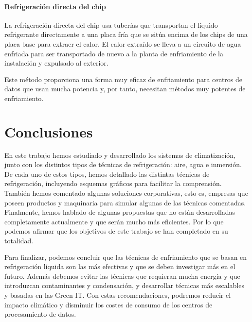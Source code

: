 \subsubsection{Refrigeración directa del chip}

La refrigeración directa del chip usa tuberías que transportan el líquido refrigerante directamente a una placa fría que se sitúa encima de los chips de una placa base para extraer el calor. El calor extraído se lleva a un circuito de agua enfriada para ser transportado de nuevo a la planta de enfriamiento de la instalación y expulsado al exterior.

Este método proporciona una forma muy eficaz de enfriamiento para centros de datos que usan mucha potencia y, por tanto, necesitan métodos muy potentes de enfriamiento.

\chapter{Conclusiones}

En este trabajo hemos estudiado y desarrollado los sistemas de climatización, junto con los distintos tipos de técnicas de refrigeración: aire, agua e inmersión. De cada uno de estos tipos, hemos detallado las distintas técnicas de refrigeración, incluyendo esquemas gráficos para facilitar la comprensión. También hemos comentado algunas soluciones corporativas, esto es, empresas que poseen productos y maquinaria para simular algunas de las técnicas comentadas. Finalmente, hemos hablado de algunas propuestas que no están desarrolladas completamente actualmente y que serán mucho más eficientes. Por lo que podemos afirmar que los objetivos de este trabajo se han completado en su totalidad.

Para finalizar, podemos concluir que las técnicas de enfriamiento que se basan en refrigeración líquida son las más efectivas y que se deben investigar más en el futuro. Además debemos evitar las técnicas que requieran mucha energía y que introduzcan contaminantes y condensación, y desarrollar técnicas más escalables y basadas en las Green IT. Con estas recomendaciones, podremos reducir el impacto climático y disminuir los costes de consumo de los centros de procesamiento de datos.


